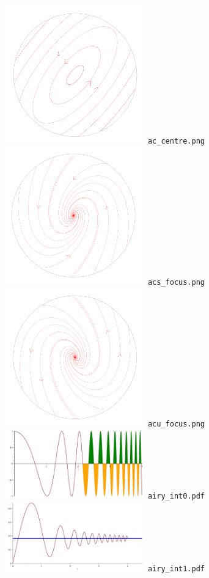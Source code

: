 \documentclass[a4paper]{amsart}
\begin{document}
\includegraphics[width=6cm]{ac_centre.png}\verb+ ac_centre.png+\\
\includegraphics[width=6cm]{acs_focus.png}\verb+ acs_focus.png+\\
\includegraphics[width=6cm]{acu_focus.png}\verb+ acu_focus.png+\\
\includegraphics[width=6cm]{airy_int0.pdf}\verb+ airy_int0.pdf+\\
\includegraphics[width=6cm]{airy_int1.pdf}\verb+ airy_int1.pdf+\\
\end{document}

